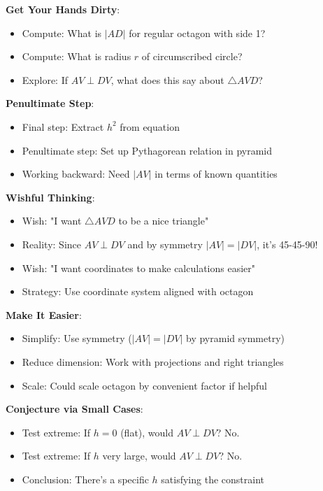 \documentclass[12pt]{article}
\begin{document}
\begin{strategicbox}
\textbf{Get Your Hands Dirty}:
\begin{itemize}
    \item Compute: What is $|AD|$ for regular octagon with side 1?
    \item Compute: What is radius $r$ of circumscribed circle?
    \item Explore: If $AV \perp DV$, what does this say about $\triangle AVD$?
\end{itemize}

\textbf{Penultimate Step}:
\begin{itemize}
    \item Final step: Extract $h^2$ from equation
    \item Penultimate step: Set up Pythagorean relation in pyramid
    \item Working backward: Need $|AV|$ in terms of known quantities
\end{itemize}

\textbf{Wishful Thinking}:
\begin{itemize}
    \item Wish: "I want $\triangle AVD$ to be a nice triangle"
    \item Reality: Since $AV \perp DV$ and by symmetry $|AV| = |DV|$, it's 45-45-90!
    \item Wish: "I want coordinates to make calculations easier"
    \item Strategy: Use coordinate system aligned with octagon
\end{itemize}

\textbf{Make It Easier}:
\begin{itemize}
    \item Simplify: Use symmetry ($|AV| = |DV|$ by pyramid symmetry)
    \item Reduce dimension: Work with projections and right triangles
    \item Scale: Could scale octagon by convenient factor if helpful
\end{itemize}

\textbf{Conjecture via Small Cases}:
\begin{itemize}
    \item Test extreme: If $h = 0$ (flat), would $AV \perp DV$? No.
    \item Test extreme: If $h$ very large, would $AV \perp DV$? No.
    \item Conclusion: There's a specific $h$ satisfying the constraint
\end{itemize}


\end{strategicbox}
\end{document}
